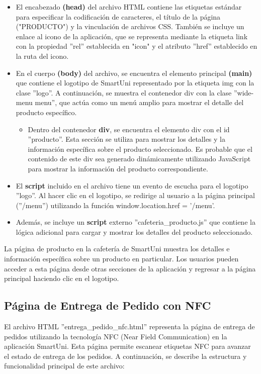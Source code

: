 \documentclass[12pt]{report}
\begin{document}
\begin{itemize}
    \item El encabezado\textbf{ (head) }del archivo HTML contiene las etiquetas estándar para especificar la codificación de caracteres, el título de la página ("PRODUCTO") y la vinculación de archivos CSS. También se incluye un enlace al icono de la aplicación, que se representa mediante la etiqueta link con la propiedad ''rel'' establecida en "icon" y el atributo ''href'' establecido en la ruta del icono.

    \item En el cuerpo\textbf{ (body) }del archivo, se encuentra el elemento principal \textbf{(main)} que contiene el logotipo de SmartUni representado por la etiqueta img con la clase ''logo''. A continuación, se muestra el contenedor div con la clase ''wide-menu menu'', que actúa como un menú amplio para mostrar el detalle del producto específico.

    \begin{itemize}
        \item Dentro del contenedor \textbf{div}, se encuentra el elemento div con el id ''producto''. Esta sección se utiliza para mostrar los detalles y la información específica sobre el producto seleccionado. Es probable que el contenido de este div sea generado dinámicamente utilizando JavaScript para mostrar la información del producto correspondiente.
    \end{itemize}

    \item El \textbf{script}  incluido en el archivo tiene un evento de escucha para el logotipo ''logo''. Al hacer clic en el logotipo, se redirige al usuario a la página principal (''/menu'') utilizando la función window.location.href = '/menu'.

    \item Además, se incluye un \textbf{script} externo ''cafeteria\_producto.js'' que contiene la lógica adicional para cargar y mostrar los detalles del producto seleccionado.
\end{itemize}

La página de producto en la cafetería de SmartUni muestra los detalles e información específica sobre un producto en particular. Los usuarios pueden acceder a esta página desde otras secciones de la aplicación y regresar a la página principal haciendo clic en el logotipo.

\subsection{Página de Entrega de Pedido con NFC}
El archivo HTML ''entrega\_pedido\_nfc.html'' representa la página de entrega de pedidos utilizando la tecnología NFC (Near Field Communication) en la aplicación SmartUni. Esta página permite escanear etiquetas NFC para avanzar el estado de entrega de los pedidos. A continuación, se describe la estructura y funcionalidad principal de este archivo:
\end{document}
